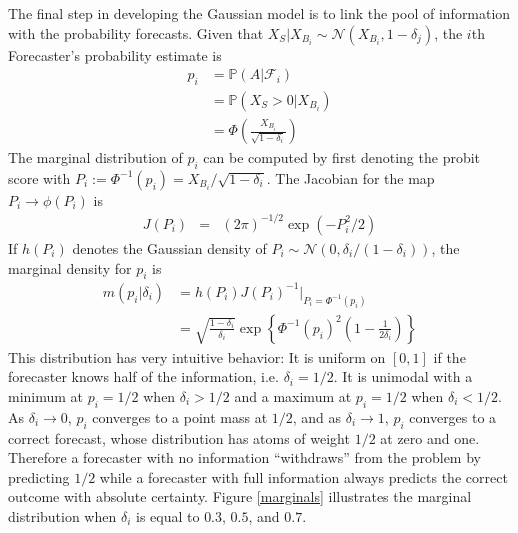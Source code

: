 \documentclass[11pt]{article}
\renewcommand{\P}{\mathbb{P}}
\theoremstyle{definition}
\theoremstyle{definition}
\def\one{{\bf 1}}
\def\P{{\mathbb P}}
\begin{document}
The final step in developing the Gaussian model is
to link the pool of information with the probability forecasts. Given that $X_S | X_{B_i} \sim \mathcal{N}\left(X_{B_i}, 1-\delta_j\right)$, the $i$th Forecaster's probability estimate is
\begin{align}
p_i &= \P\left(A | \mathcal{F}_{i}\right) \nonumber \\
 &= \P\left(X_S > 0 | X_{B_i}\right) \nonumber \\
 &= \Phi\left( \frac{X_{B_i}}{\sqrt{1-\delta_i}}\right) \label{indFore}
\end{align}
The marginal distribution of $p_i$ can be computed by first denoting the probit score with $P_{i} := \Phi^{-1}(p_i) = X_{B_i}/\sqrt{1-\delta_i}$. The Jacobian for the map $P_{i} \to \phi(P_i)$ is
\begin{eqnarray*}
J(P_i) &=& (2\pi)^{-1/2} \exp \left( - P_i^2/2   \right) 
\end{eqnarray*}
If $h(P_i)$ denotes the Gaussian density of $P_i \sim \mathcal{N}\left(0, \delta_i / (1-\delta_i)\right)$,
the marginal density for $p_i$ is
\begin{align*}
 m\left(p_i | \delta_i \right) &= h(P_i) J(P_i)^{-1} \bigg|_{P_i = \Phi^{-1}(p_i)}\\
&= \sqrt{\frac{1-\delta_i}{\delta_i}} \exp 
   \left\{ \Phi^{-1}(p_i)^2 \left(1-\frac{1}{2 \delta_i} \right) \right\} 
\end{align*}
This distribution has very intuitive behavior: It is uniform on $[0,1]$ if the forecaster knows half of the
information, i.e. $\delta_i = 1/2$.  It is
unimodal with a minimum at $p_i = 1/2$ when $\delta_i > 1/2$ and a
maximum at $p_i = 1/2$ when $\delta_i < 1/2$.  As $\delta_i \to 0$, $p_i$ converges to a point mass at $1/2$, and as $\delta_i \to 1$, $p_i$ converges to
a correct forecast, whose distribution has atoms of weight $1/2$ at
zero and one. Therefore a forecaster with no information ``withdraws'' from the problem by predicting $1/2$ while a forecaster with full information always predicts the correct outcome with absolute certainty. Figure \ref{marginals} illustrates the marginal
distribution when $\delta_i$ is equal to $0.3$, $0.5$, and $0.7$.
\end{document}
